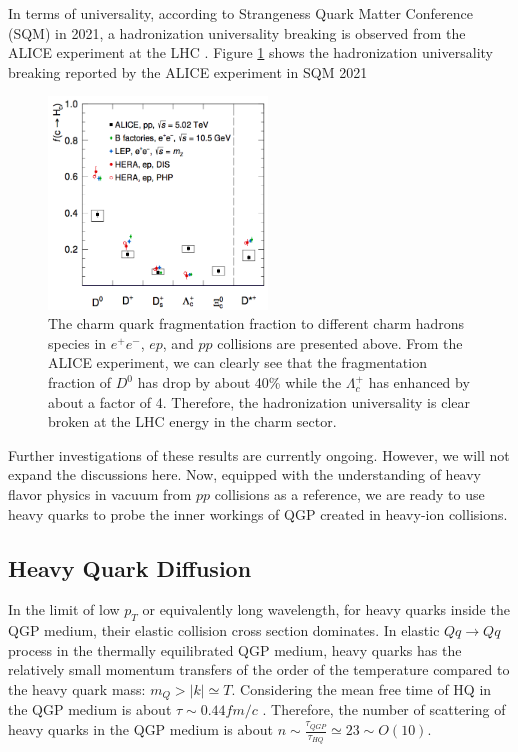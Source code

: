 In terms of universality, according to Strangeness Quark Matter Conference (SQM) in 2021, a hadronization universality breaking is observed from the ALICE experiment at the LHC \cite{GMISQM}. Figure \ref{CharmFFALICE} shows the hadronization universality breaking reported by the ALICE experiment in SQM 2021

 \begin{figure}[hbtp]
\begin{center}
\includegraphics[width=0.52\textwidth]{Figures/Chapter1/ALICECharmFF.png}
\caption{The charm quark fragmentation fraction to different charm hadrons species in $e^+e^-$, $ep$, and $pp$ collisions are presented above. From the ALICE experiment, we can clearly see that the fragmentation fraction of $D^0$ has drop by about 40\% while the $\Lambda_c^+$ has enhanced by about a factor of 4. Therefore, the hadronization universality is clear broken at the LHC energy in the charm sector.}
\label{CharmFFALICE}
\end{center}
\end{figure}   

Further investigations of these results are currently ongoing. However, we will not expand the discussions here. Now, equipped with the understanding of heavy flavor physics in vacuum from $pp$ collisions as a reference, we are ready to use heavy quarks to probe the inner workings of QGP created in heavy-ion collisions. 

\subsection{Heavy Quark Diffusion}

In the limit of low $p_T$ or equivalently long wavelength, for heavy quarks inside the QGP medium, their elastic collision cross section dominates. In elastic $Q q \rightarrow Q q$ process in the thermally equilibrated QGP medium, heavy quarks has the relatively small momentum transfers of the order of the temperature compared to the heavy quark mass: $m_Q > |k| \simeq T$. Considering the mean free time of HQ in the QGP medium is about $\tau \sim 0.44 fm/c$ \cite{HQTau}. Therefore, the number of scattering of heavy quarks in the QGP medium is about $n \sim \frac{\tau_{QGP}}{\tau_{HQ}} \simeq 23 \sim O(10)$.

